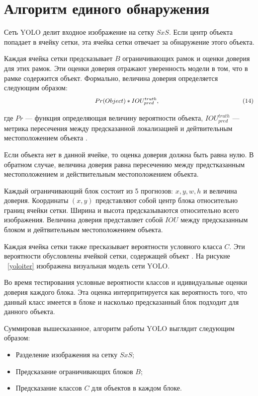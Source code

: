 \documentclass[a4paper,english,russian]{G2-105}
\begin{document}
\section{Алгоритм единого обнаружения}
\par Сеть YOLO делит входное изображение на сетку $SxS$. Если центр объекта попадает в ячейку сетки, эта ячейка сетки отвечает за обнаружение этого объекта.
\par Каждая ячейка сетки предсказывает $B$ ограничивающих рамок и оценки доверия для этих рамок. Эти оценки доверия отражают уверенность модели в том, что в рамке содержится объект. Формально, величина доверия определяется следующим образом:
\[
\ \hspace*{50mm} Pr(Object)*IOU_{pred}^{truth},  \ \hspace*{46mm} (14)
\]
\par где $Pr$ --- функция определяющая величину вероятности объекта, $IOU_{pred}^{truth}$ --- метрика пересечения между предсказанной локализацией и дейтвительным местоположением объекта \cite{17}.
\par Если объекта нет в данной ячейке, то оценка доверия должна быть равна нулю. В обратном случае, величина доверия равна пересечению между предстказанным местоположением и действительным местоположением объекта.
\par Каждый ограничивающий блок состоит из 5 прогнозов: $x, y, w, h$ и величина доверия. Координаты $(x, y)$ представляют собой центр блока относительно границ ячейки сетки. Ширина и высота предсказываются относительно всего изображения. Величина доверия представляет собой $IOU$ между предсказанным блоком и дейтвительным местоположением объекта.
\par Каждая ячейка сетки также пресказывает вероятности условного класса $C$. Эти вероятности обусловлены ячейкой сетки, содержащей объект \cite{18}. На рисукне ~\ref{yoloiter} изображена визуальная модель сети YOLO.
\par Во время тестирования условные вероятности классов и идивидуальные оценки доверия каждого блока. Эта оценка интерпритируется как вероятность того, что данный класс имеется в блоке и насколько предсказанный блок подходит для данного объекта. 
\par Суммировав вышесказанное, алгоритм работы YOLO выглядит следующим образом:
\begin{itemize}
\item Разделение изображения на сетку $SxS$;
\item Предсказание ограничивающих блоков $B$;
\item Предсказание классов $C$ для объектов в каждом блоке.
\end{itemize}
\end{document}
